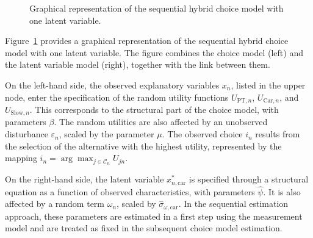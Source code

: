 \documentclass[12pt,a4paper]{article}
\newcommand{\highEducation}{\mathrm{HighEducation}}
\newcommand{\lowEducation}{\mathrm{LowEducation}}
\newcommand{\topManager}{\mathrm{TopManager}}
\newcommand{\carOrientedParents}{\mathrm{CarOrientedParents}}
\newcommand{\usedToGoToSchoolByCar}{\mathrm{UsedToGoToSchoolByCar}}
\begin{document}
\begin{figure}[htbp]
\caption{Graphical representation of the sequential hybrid choice
  model with one latent variable.}
\label{fig:hybrid_one_lv_seq_tikz}
\end{figure}

Figure~\ref{fig:hybrid_one_lv_seq_tikz} provides a graphical
representation of the sequential hybrid choice model with one latent
variable. The figure combines the choice model (left) and the latent
variable model (right), together with the link between them.

On the left-hand side, the observed explanatory variables \(x_n\),
listed in the upper node, enter the specification of the random
utility functions \(U_{\mathrm{PT},n}\), \(U_{\mathrm{Car},n}\), and
\(U_{\mathrm{Slow},n}\). This corresponds to the structural part of
the choice model, with parameters \(\beta\). The random utilities are
also affected by an unobserved disturbance \(\varepsilon_n\), scaled
by the parameter \(\mu\). The observed choice \(i_n\) results from the
selection of the alternative with the highest utility, represented by
the mapping \(i_n = \arg\max_{j \in \mathcal C_n} U_{jn}\).

On the right-hand side, the latent variable \(x^*_{n,\mathrm{car}}\)
is specified through a structural equation as a function of observed
characteristics, with parameters \(\hat{\psi}\).  It is also affected
by a random term \(\omega_n\), scaled by
\(\hat{\sigma}_{\omega,\mathrm{car}}\). In the sequential estimation
approach, these parameters are estimated in a first step using the
measurement model and are treated as fixed in the subsequent choice
model estimation.
\end{document}
